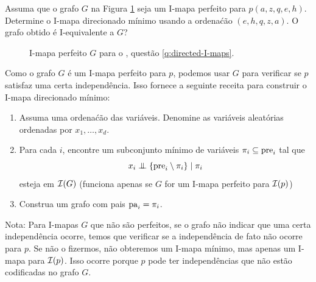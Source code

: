 \label{ex:minimal-I-maps-1}
\begin{exenumerate}
    \item Assuma que o grafo $G$ na Figura \ref{fig:I-map} seja um I-mapa perfeito para $p(a,z,q,e,h)$. Determine o I-mapa direcionado m\'inimo usando a ordena\'c\~ao $(e,h,q,z,a)$. O grafo obtido \'e I-equivalente a $G$?
    \begin{figure}[ht]
        \begin{center}
        \end{center}
        \caption{\label{fig:I-map} I-mapa perfeito $G$ para o , quest\~ao \ref{q:directed-I-maps}.}
    \end{figure}
    \label{q:directed-I-maps}
    \begin{solution} Como o grafo $G$ \'e um I-mapa perfeito para $p$, podemos usar
        $G$ para verificar se $p$ satisfaz uma certa independ\^encia. Isso fornece a seguinte receita para construir o I-mapa direcionado m\'inimo:
        \begin{enumerate}
            \item Assuma uma ordena\'c\~ao das vari\'aveis. Denomine as vari\'aveis aleat\'orias ordenadas por $x_1, \ldots, x_d$.
            \item Para cada $i$, encontre um subconjunto m\'inimo de vari\'aveis $\pi_i \subseteq \mathrm{pre}_i$ tal que $$ x_i \mathrel{\perp\mspace{-10mu}\perp} \{\mathrm{pre}_i \setminus \pi_i \} \mid \pi_i$$ esteja em $\mathcal{I}(G)$ (funciona apenas se $G$ for um I-mapa perfeito para $\mathcal{I}(p)$)
            \item Construa um grafo com pais $\mathrm{pa}_i=\pi_i$.
        \end{enumerate}
        
        Nota: Para I-mapas $G$ que n\~ao s\~ao perfeitos, se o grafo n\~ao indicar que uma certa independ\^encia ocorre, temos que verificar se a independ\^encia de fato n\~ao ocorre para $p$. Se n\~ao o fizermos, n\~ao obteremos um I-mapa m\'inimo, mas apenas um I-mapa para $\mathcal{I}(p)$. Isso ocorre porque $p$ pode ter independ\^encias que n\~ao est\~ao codificadas no grafo $G$. 
        

\end{solution}
\end{exenumerate}

